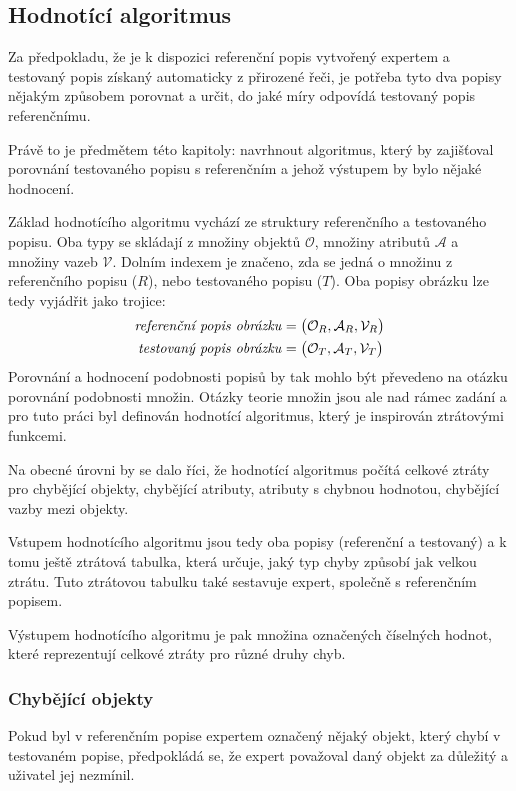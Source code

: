 \subsection{Hodnotící algoritmus}\label{subsec:hodnoceni}
Za předpokladu, že je k dispozici referenční popis vytvořený expertem a testovaný popis získaný automaticky z přirozené řeči,
je potřeba tyto dva popisy nějakým způsobem porovnat a určit, do jaké míry odpovídá testovaný popis referenčnímu.

Právě to je předmětem této kapitoly: navrhnout algoritmus, který by zajišťoval porovnání testovaného popisu s referenčním a jehož výstupem by bylo nějaké hodnocení.

Základ hodnotícího algoritmu vychází ze struktury referenčního a testovaného popisu.
Oba typy se skládají z množiny objektů $\mathcal O$, množiny atributů $\mathcal A$ a množiny vazeb $\mathcal V$.
Dolním indexem je značeno, zda se jedná o množinu z referenčního popisu ($R$), nebo testovaného popisu ($T$).
Oba popisy obrázku lze tedy vyjádřit jako trojice:
\begin{align*}
	\text{\emph{referenční popis obrázku}} & = \bigl( \mathcal{O}_{R}, \mathcal{A}_{R}, \mathcal{V}_{R} \bigr) \\
	\text{\emph{testovaný popis obrázku}}  & = \bigl( \mathcal{O}_{T}, \mathcal{A}_{T}, \mathcal{V}_{T} \bigr)
\end{align*}
Porovnání a hodnocení podobnosti popisů by tak mohlo být převedeno na otázku porovnání podobnosti množin.
Otázky teorie množin jsou ale nad rámec zadání a pro tuto práci byl definován hodnotící algoritmus,
který je inspirován ztrátovými funkcemi.

Na obecné úrovni by se dalo říci, že hodnotící algoritmus počítá celkové ztráty pro chybějící objekty,
chybějící atributy, atributy s chybnou hodnotou, chybějící vazby mezi objekty.

Vstupem hodnotícího algoritmu jsou tedy oba popisy (referenční a testovaný) a k tomu ještě ztrátová tabulka, která určuje, jaký typ chyby způsobí jak velkou ztrátu.
Tuto ztrátovou tabulku také sestavuje expert, společně s referenčním popisem.

Výstupem hodnotícího algoritmu je pak množina označených číselných hodnot, které reprezentují celkové ztráty pro různé druhy chyb.

\newpage
\subsubsection{Chybějící objekty}
Pokud byl v referenčním popise expertem označený nějaký objekt,
který chybí v testovaném popise, předpokládá se, že expert považoval daný objekt za důležitý a uživatel jej nezmínil.

